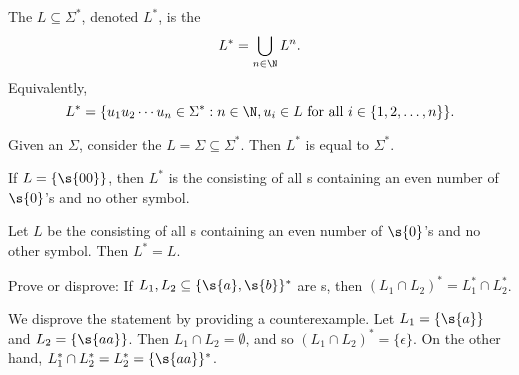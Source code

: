 \begin{flex}
\begin{definition} \label{definition:Star-operation-on-a-language}
The  $L \subseteq \Sigma^*$, denoted $L^*$, is the  
\[
L^* = \bigcup_{n \in \N} L^n.
\]
Equivalently, 
\[
L^* = \{u_1u_2\cdots u_n \in \Sigma^* : n \in \N, u_i \in L \text{ for all } i \in \{1,2,\ldots,n\}\}.
\]
\end{definition}

\begin{example}[$\Sigma^*$] \label{example:Sigma-star}
Given an  $\Sigma$, consider the  $L = \Sigma \subseteq \Sigma^*$. Then $L^*$ is equal to $\Sigma^*$.
\end{example}

\begin{example}[$\{00\}^*$] \label{example:00-star}
If $L = \{\s{00}\}$, then $L^*$ is the  consisting of all s containing an even number of $\s{0}$'s and no other symbol. 
\end{example}

\begin{example}[$(\{00\}^*)^*$] \label{example:00-starstar}
Let $L$ be the  consisting of all s containing an even number of $\s{0}$'s and no other symbol. Then $L^* = L$. 
\end{example}
\end{flex}


\begin{flex}
\begin{exercise} \label{exercise:Can-you-distribute-star-over-intersection}
Prove or disprove: If $L_1, L_2 \subseteq \{\s{a},\s{b}\}^*$ are s, then $(L_1 \cap L_2)^* = L_1^* \cap L_2^*$.
\end{exercise}

\begin{solution}
We disprove the statement by providing a counterexample. Let $L_1 = \{\s{a}\}$ and $L_2 = \{\s{aa}\}$. Then $L_1 \cap L_2 = \emptyset$, and so $(L_1 \cap L_2)^* = \{\epsilon\}$. On the other hand, $L_1^* \cap L_2^* = L_2^* = \{\s{aa}\}^*$.
\end{solution}
\end{flex}


